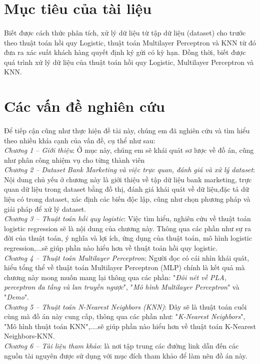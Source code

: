 \documentclass{report}
\newcommand\tab[1][1.25cm]{\hspace*{#1}}
\begin{document}
\fontsize{16}{10}\selectfont
\section{Mục tiêu của tài liệu}
    \fontsize{13}{10}\selectfont\paragraph{}
        Biết được cách thức phân tích, xử lý dữ liệu từ tập dữ liệu (dataset) cho trước theo thuật toán hồi quy Logistic, thuật toán Multilayer Perceptron và KNN từ đó đưa ra xác suất khách hàng quyết định ký gửi có kỳ hạn. Đồng thời, biết được quá trình xử lý dữ liệu của thuật toán hồi quy Logistic, Multilayer Perceptron và KNN.

\fontsize{13}{10}\selectfont
\section{Các vấn đề nghiên cứu}
    \fontsize{13}{10}\selectfont\paragraph{}
        Để tiếp cận cũng như thực hiện đề tài này, chúng em đã nghiên cứu và tìm hiểu theo nhiều khía cạnh của vấn đề, cụ thể như sau:\\\tab
        \textit{Chương 1 – Giới thiệu}: Ở mục này, chúng em sẽ khái quát sơ lược về đồ án, cũng như phân công nhiệm vụ cho từng thành viên\\\tab
        \textit{Chương 2 – Dataset Bank Marketing và việc trực quan, đánh giá và xử lý dataset}: Nội dung chủ yếu ở chương này là giới thiệu về tập dữ liệu bank marketing, trực quan dữ liệu trong dataset bằng đồ thị, đánh giá khái quát về dữ liệu,đặc tả dữ liệu có trong dataset, xác định các biến độc lập, cũng như chọn phương pháp và giải pháp để xử lý dataset.\\\tab
        \textit{Chương 3 – Thuật toán hồi quy logistic}: Việc tìm hiểu, nghiên cứu về thuật toán logistic regression sẽ là nội dung của chương này. Thông qua các phần như sự ra đời của thuật toán, ý nghĩa và lợi ích, ứng dụng của thuật toán, mô hình logistic regression,...sẽ giúp phần nào hiểu hơn về thuật toán hồi quy logistic.\\\tab
        \textit{Chương 4 – Thuật toán Multilayer Perceptron}: Người đọc có cái nhìn khái quát, hiểu tổng thể về thuật toán Multilayer Perceptron (MLP) chính là kết quả mà chương này mong muốn mang lại thông qua các phần: "\textit{Đôi nét về PLA, perceptron đa tầng và lan truyền ngược}", "\textit{Mô hình Multilayer Perceptron}" và "\textit{Demo}".\\\tab
        \textit{Chương 5 – Thuật toán N-Nearest Neighbors (KNN)}: Đây sẽ là thuật toán cuối cùng mà đồ án này cung cấp, thông qua các phần như: "\textit{K-Nearest Neighbors}", "Mô hình thuật toán KNN",....sẽ giúp phần nào hiểu hơn về thuật toán K-Nearest Neighbors-KNN.\\\tab
        \textit{Chương 6 – Tài liệu tham khảo}: là nơi tập trung các đường link dẫn đến các nguồn tài nguyên được sử dụng với mục đích tham khảo để làm nên đồ án này.
\fontsize{16}{10}\selectfont
\end{document}
